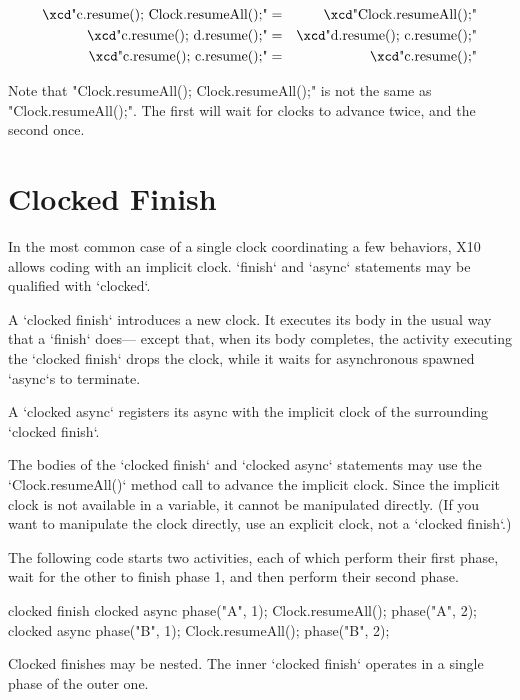 {\small
\begin{eqnarray}
 \mbox{\xcd"c.resume(); Clock.resumeAll();"}       &=& \mbox{\xcd"Clock.resumeAll();"}\\
 \mbox{\xcd"c.resume(); d.resume();"} &=& \mbox{\xcd"d.resume(); c.resume();"}\\
 \mbox{\xcd"c.resume(); c.resume();"} &=& \mbox{\xcd"c.resume();"}
\end{eqnarray}
}

Note that \xcd"Clock.resumeAll(); Clock.resumeAll();" is not the same as \xcd"Clock.resumeAll();". The
first will wait for clocks to advance twice, and the second
once.  


\section{Clocked Finish}
\label{ClockedFinish}

In the most common case of a single clock coordinating a few behaviors, X10
allows coding with an implicit clock.  \xcd`finish` and \xcd`async` statements
may be qualified with \xcd`clocked`.  

A \xcd`clocked finish` introduces a new clock.  It executes its body in the
usual way that a \xcd`finish` does--- except that, when its body completes,
the activity executing the \xcd`clocked finish` drops the clock, while it
waits for asynchronous spawned \xcd`async`s to terminate.  

A \xcd`clocked async` registers its async with the implicit clock of
the surrounding \xcd`clocked finish`.   

The bodies of the \xcd`clocked finish` and \xcd`clocked async`
statements  may use the
\xcd`Clock.resumeAll()` 
method call to advance the implicit clock.  Since the implicit clock is not
available in a variable, it cannot be manipulated directly. (If you want to
manipulate the clock directly, use an explicit clock, not a \xcd`clocked finish`.)

\begin{ex}
The following code starts two activities, each of which perform their first
phase, wait for the other to finish phase 1, and then perform their second
phase.  
\begin{xten}
clocked finish {
  clocked async {
     phase("A", 1);
     Clock.resumeAll();
     phase("A", 2);
  }
  clocked async {
     phase("B", 1);
     Clock.resumeAll();
     phase("B", 2);
  }
}
\end{xten}
\end{ex}


Clocked finishes may be nested.  The inner \xcd`clocked finish` operates in a
single phase of the outer one.  
